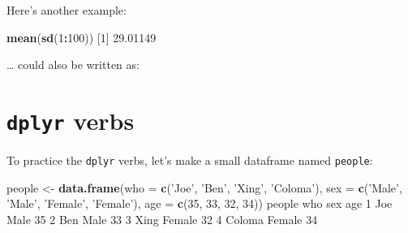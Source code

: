 \documentclass[
]{book}
\newenvironment{Shaded}{\begin{snugshade}}{\end{snugshade}}
\newcommand{\DataTypeTok}[1]{\textcolor[rgb]{0.13,0.29,0.53}{#1}}
\newcommand{\DecValTok}[1]{\textcolor[rgb]{0.00,0.00,0.81}{#1}}
\newcommand{\FloatTok}[1]{\textcolor[rgb]{0.00,0.00,0.81}{#1}}
\newcommand{\KeywordTok}[1]{\textcolor[rgb]{0.13,0.29,0.53}{\textbf{#1}}}
\newcommand{\NormalTok}[1]{#1}
\newcommand{\OperatorTok}[1]{\textcolor[rgb]{0.81,0.36,0.00}{\textbf{#1}}}
\newcommand{\StringTok}[1]{\textcolor[rgb]{0.31,0.60,0.02}{#1}}
\begin{document}
Here's another example:

\begin{Shaded}
\begin{Highlighting}[]
\KeywordTok{mean}\NormalTok{(}\KeywordTok{sd}\NormalTok{(}\DecValTok{1}\OperatorTok{:}\DecValTok{100}\NormalTok{))}
\NormalTok{[}\DecValTok{1}\NormalTok{] }\FloatTok{29.01149}
\end{Highlighting}
\end{Shaded}

\ldots{} could also be written as:

\begin{Shaded}
\end{Shaded}

\hypertarget{dplyr-verbs}{%
\section*{\texorpdfstring{\texttt{dplyr} verbs}{dplyr verbs}}\label{dplyr-verbs}}

To practice the \texttt{dplyr} verbs, let's make a small dataframe named \texttt{people}:

\begin{Shaded}
\begin{Highlighting}[]
\NormalTok{people <-}\StringTok{ }\KeywordTok{data.frame}\NormalTok{(}\DataTypeTok{who =} \KeywordTok{c}\NormalTok{(}\StringTok{'Joe'}\NormalTok{, }\StringTok{'Ben'}\NormalTok{, }\StringTok{'Xing'}\NormalTok{, }\StringTok{'Coloma'}\NormalTok{),}
                    \DataTypeTok{sex =} \KeywordTok{c}\NormalTok{(}\StringTok{'Male'}\NormalTok{, }\StringTok{'Male'}\NormalTok{, }\StringTok{'Female'}\NormalTok{, }\StringTok{'Female'}\NormalTok{),}
                    \DataTypeTok{age =} \KeywordTok{c}\NormalTok{(}\DecValTok{35}\NormalTok{, }\DecValTok{33}\NormalTok{, }\DecValTok{32}\NormalTok{, }\DecValTok{34}\NormalTok{))}
\NormalTok{people}
\NormalTok{     who    sex age}
\DecValTok{1}\NormalTok{    Joe   Male  }\DecValTok{35}
\DecValTok{2}\NormalTok{    Ben   Male  }\DecValTok{33}
\DecValTok{3}\NormalTok{   Xing Female  }\DecValTok{32}
\DecValTok{4}\NormalTok{ Coloma Female  }\DecValTok{34}
\end{Highlighting}
\end{Shaded}
\end{document}
